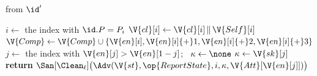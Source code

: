 \begin{interface}
{ \quad from $\id'$
\begin{algorithmic}[1]
\algcont
{}
\State $i \gets$ the index with $\id.P = P_i$
\State $\V{cl}[i] \gets \V{cl}[i] \, \| \, \V{Self}[i]$
\State $\V{Comp} \gets \V{Comp} \cup \{\V{en}[i], \V{en}[i]{+}1, \V{en}[i]{+}2, \V{en}[i]{+}3\}$ \label{ln:ckewiden}
\State $j \gets$ the index with $\V{en}[j] > \V{en}[1-j]$; \ $\kappa \gets \none$
  \State $\kappa \gets \V{sk}[j]$ \label{ln:ckeunfetched}
\EndIf
\State \textbf{return} $\San[\Clean_{\ell}]\bigl(\Adv(\V{st}, \op{ReportState}, i, \kappa, \V{Att}[\V{en}[j]])\bigr)$ \label{ln:ckereport}
\algsave
\end{algorithmic}}
\end{interface}
